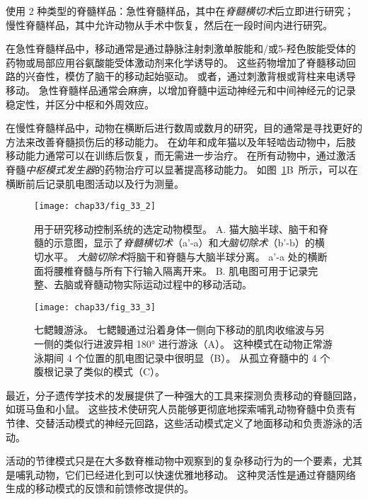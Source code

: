 \begin{proposition}[用于研究移动神经元控制的样品]
	\quad \quad 使用 2 种类型的脊髓样品：急性脊髓样品，其中在\textit{脊髓横切术}后立即进行研究；
	慢性脊髓样品，其中允许动物从手术中恢复，然后在一段时间内进行研究。
	
	\quad \quad 在急性脊髓样品中，移动通常是通过静脉注射刺激单胺能和/或5-羟色胺能受体的药物或局部应用谷氨酸能受体激动剂来化学诱导的。
	这些药物增加了脊髓移动回路的兴奋性，模仿了脑干的移动起始驱动。
	或者，通过刺激背根或背柱来电诱导移动。
	急性脊髓样品通常会麻痹，以增加脊髓中运动神经元和中间神经元的记录稳定性，并区分中枢和外周效应。
	
	\quad \quad 在慢性脊髓样品中，动物在横断后进行数周或数月的研究，目的通常是寻找更好的方法来改善脊髓损伤后的移动能力。
	在幼年和成年猫以及年轻啮齿动物中，后肢移动能力通常可以在训练后恢复，而无需进一步治疗。
	在所有动物中，通过激活脊髓\textit{中枢模式发生器}的药物治疗可以显著提高移动能力。
	如图~\ref{fig:33_2}B~所示，可以在横断前后记录肌电图活动以及行为测量。
	
\end{proposition}


\begin{figure}[htbp]
	\centering
	\texttt{[image: chap33/fig\_33\_2]}
	\caption{用于研究移动控制系统的选定动物模型。
	A. 猫大脑半球、脑干和脊髓的示意图，显示了\textit{脊髓横切术}（a'-a）和\textit{大脑切除术}（b'-b）的横切水平。
	\textit{大脑切除术}将脑干和脊髓与大脑半球分离。
	a'-a 处的横断面将腰椎脊髓与所有下行输入隔离开来。
	B. 肌电图可用于记录完整、去脑或脊髓动物实际运动过程中的移动活动。}
	\label{fig:33_2}
\end{figure}


\begin{figure}[htbp]
	\centering
	\texttt{[image: chap33/fig\_33\_3]}
	\caption{七鳃鳗游泳。
	七鳃鳗通过沿着身体一侧向下移动的肌肉收缩波与另一侧的类似行进波异相 180° 进行游泳（A）。
	这种模式在动物正常游泳期间 4 个位置的肌电图记录中很明显（B）。
	从孤立脊髓中的 4 个腹根记录了类似的模式（C）。}
	\label{fig:33_3}
\end{figure}


最近，分子遗传学技术的发展提供了一种强大的工具来探测负责移动的脊髓回路，如斑马鱼和小鼠。
这些技术使研究人员能够更彻底地探索哺乳动物脊髓中负责有节律、交替活动模式的神经元回路，这些活动模式定义了地面移动和负责游泳的活动。


活动的节律模式只是在大多数脊椎动物中观察到的复杂移动行为的一个要素，尤其是哺乳动物，它们已经进化到可以快速优雅地移动。
这种灵活性是通过脊髓网络生成的移动模式的反馈和前馈修改提供的。


